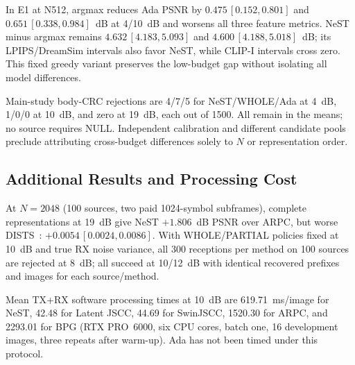 In E1 at N512, argmax reduces Ada PSNR by $0.475\,[0.152,0.801]$ and $0.651\,[0.338,0.984]$~dB at 4/10~dB and worsens all three feature metrics. NeST minus argmax remains $4.632\,[4.183,5.093]$ and $4.600\,[4.188,5.018]$~dB; its LPIPS/DreamSim intervals also favor NeST, while CLIP-I intervals cross zero. This fixed greedy variant preserves the low-budget gap without isolating all model differences.

Main-study body-CRC rejections are 4/7/5 for NeST/WHOLE/Ada at 4~dB, 1/0/0 at 10~dB, and zero at 19~dB, each out of 1500. All remain in the means; no source requires NULL. Independent calibration and different candidate pools preclude attributing cross-budget differences solely to $N$ or representation order.

\subsection{Additional Results and Processing Cost}
At $N=2048$ (100 sources, two paid 1024-symbol subframes), complete representations at 19~dB give NeST $+1.806$~dB PSNR over ARPC, but worse DISTS~\cite{dists}: $+0.0054\,[0.0024,0.0086]$. With WHOLE/PARTIAL policies fixed at 10~dB and true RX noise variance, all 300 receptions per method on 100 sources are rejected at 8~dB; all succeed at 10/12~dB with identical recovered prefixes and images for each source/method.

Mean TX+RX software processing times at 10~dB are 619.71~ms/image for NeST, 42.48 for Latent JSCC, 44.69 for SwinJSCC, 1520.30 for ARPC, and 2293.01 for BPG (RTX PRO~6000, six CPU cores, batch one, 16 development images, three repeats after warm-up). Ada has not been timed under this protocol.
